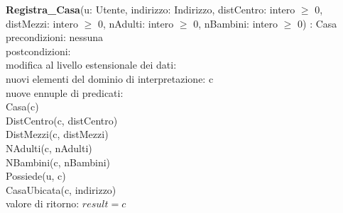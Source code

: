\documentclass[a4paper,12pt]{report}
\begin{document}
        \newpage

        \hspace*{-1cm}
        \textbf{Registra\_Casa}(u: Utente, indirizzo: Indirizzo, distCentro: intero $\geq$ 0, distMezzi: intero $\geq$ 0, nAdulti: intero $\geq$ 0, nBambini: intero $\geq$ 0) : Casa \\
        \hspace*{1cm} precondizioni: nessuna \\
        \hspace*{1cm} postcondizioni: \\
        \hspace*{2cm} modifica al livello estensionale dei dati: \\
        \hspace*{3cm} nuovi elementi del dominio di interpretazione: c \\
        \hspace*{3cm} nuove ennuple di predicati: \\
        \hspace*{4cm} Casa(c) \\
        \hspace*{4cm} DistCentro(c, distCentro) \\
        \hspace*{4cm} DistMezzi(c, distMezzi) \\
        \hspace*{4cm} NAdulti(c, nAdulti) \\
        \hspace*{4cm} NBambini(c, nBambini) \\
        \hspace*{4cm} Possiede(u, c) \\
        \hspace*{4cm} CasaUbicata(c, indirizzo) \\
        \hspace*{2cm} valore di ritorno: $result = c$ \\ \\
\end{document}
